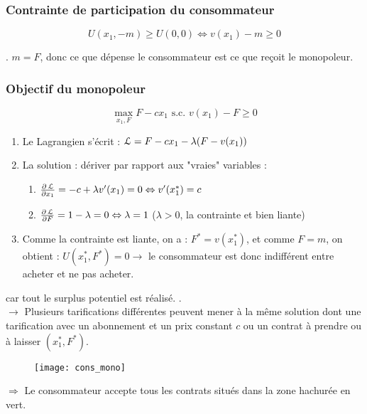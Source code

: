 \subsubsection{Contrainte de participation du consommateur}

\begin{equation*}
U(x_1, -m) \geq U(0,0) \Leftrightarrow v(x_1) - m \geq 0
\end{equation*}

. $m = F$, donc ce que dépense le consommateur est ce que reçoit le monopoleur.

\subsubsection{Objectif du monopoleur}

\begin{equation*}
\max_{x_1, F} F - c x_1 \text{ s.c. } v(x_1) - F \geq 0
\end{equation*}

\begin{enumerate}
\item Le Lagrangien s'écrit : $\operatorname{\mathcal{L}} = F - c x_1 - \lambda (F - v(x_1))$
\item La solution : dériver par rapport aux "vraies" variables :
	\begin{enumerate}
	\item[] $\frac{\partial \operatorname{\mathcal{L}}}{\partial x_1} = - c + \lambda v'(x_1) = 0 \Leftrightarrow v'(x^*_1) = c$
	\item[] $\frac{\partial \operatorname{\mathcal{L}}}{\partial F} = 1 - \lambda = 0 \Leftrightarrow \lambda = 1$ ($\lambda > 0$, la contrainte et bien liante)
	\end{enumerate}
\item Comme la contrainte est liante, on a : $F^* = v(x^*_1)$, et comme $F = m$, on obtient : $U(x^*_1, F^*) = 0 \rightarrow$ le consommateur est donc indifférent entre acheter et ne pas acheter.
\end{enumerate}

 car tout le surplus potentiel est réalisé. .\\
$\rightarrow$ Plusieurs tarifications différentes peuvent mener à la même solution dont une tarification avec un abonnement et un prix constant $c$ ou un contrat à prendre ou à laisser $(x^*_1, F^*)$.
\begin{figure}[H]
	\centering
	\texttt{[image: cons\_mono]}
\end{figure}
$\Rightarrow$ Le consommateur accepte tous les contrats situés dans la zone hachurée en vert.

